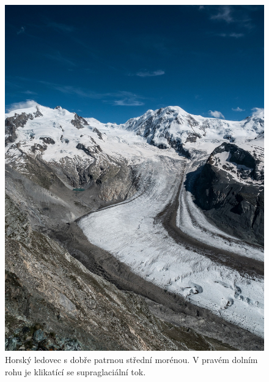 \begin{figure}
	\centering
	\includegraphics[width=1\linewidth]{obrazky/glac/ledovec_svyc}
	\caption{Horský ledovec s dobře patrnou střední morénou. V pravém dolním rohu je klikatící se supraglaciální tok.}
	\label{fig:ledovec}
\end{figure}


